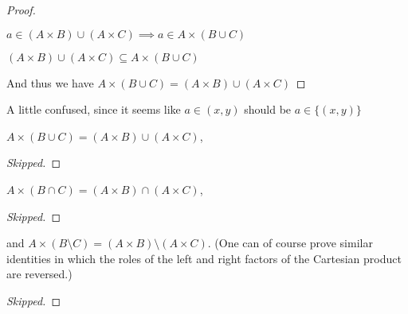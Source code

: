 \documentclass[../../main.tex]{subfiles}
\begin{document}
\begin{enumerate}
\begin{proof}
\begin{lxl}[resume]
\begin{lxl}
                \end{lxl}
                \item $a \in (A \times B) \cup (A \times C) \implies a \in A \times (B \cup C)$
                \item $(A \times B) \cup (A \times C) \subseteq A \times (B \cup C)$
            \end{lxl}
            And thus we have $A \times (B \cup C) = (A \times B) \cup (A \times C)$
        \end{proof}
        \begin{xx}
        A little confused, since it seems like $a \in (x,y)$ should be $a \in \{(x,y)\}$
            
        \end{xx} 
        \item \begin{q}
            $A \times (B \cup C) = (A \times B) \cup (A \times C)$,
        \end{q}    
        \begin{proof}
            [Skipped]
        \end{proof}
        \begin{xx}
            
        \end{xx}   
        \item \begin{q}
$A \times (B \cap C) = (A \times B) \cap (A \times C)$,
        \end{q}    
        \begin{proof}
            [Skipped]
        \end{proof}
        \begin{xx}
            
        \end{xx}      
        \item \begin{q}
            and $A \times (B\setminus C) = (A \times B)\setminus(A \times C)$. (One can of course prove similar identities in which the roles of the left and right factors of the Cartesian product are reversed.)
        \end{q}
        \begin{proof}
            [Skipped]
        \end{proof}
        \begin{xx}
            
        \end{xx}        
    \end{enumerate}    
\end{document}
